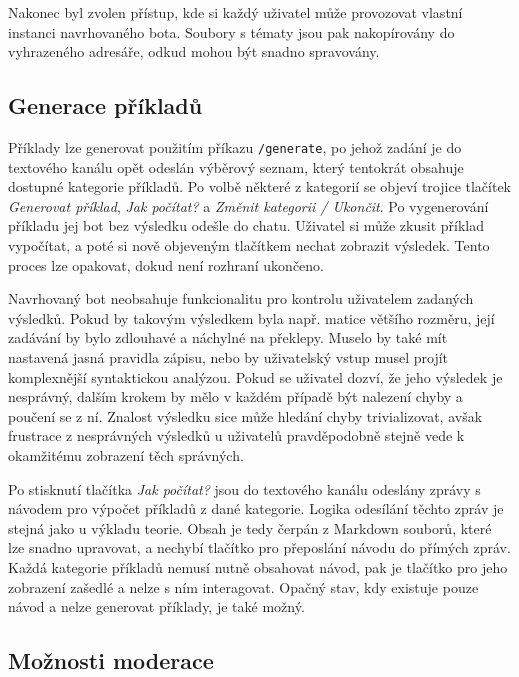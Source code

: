 \documentclass[FM]{tulthesis}
\begin{document}
	Nakonec byl zvolen přístup, kde si každý uživatel může provozovat vlastní instanci navrhovaného bota. Soubory s tématy jsou pak nakopírovány do vyhrazeného adresáře, odkud mohou být snadno spravovány. %
	
	\subsection{Generace příkladů} %
	
	Příklady lze generovat použitím příkazu \verb*|/generate|, po jehož zadání je do textového kanálu opět odeslán výběrový seznam, který tentokrát obsahuje dostupné kategorie příkladů. Po volbě některé z kategorií se objeví trojice tlačítek \textit{Generovat příklad}, \textit{Jak počítat?} a \textit{Změnit kategorii / Ukončit}. Po vygenerování příkladu jej bot bez výsledku odešle do chatu. Uživatel si může zkusit příklad vypočítat, a poté si nově objeveným tlačítkem nechat zobrazit výsledek. Tento proces lze opakovat, dokud není rozhraní ukončeno.
	
	Navrhovaný bot neobsahuje funkcionalitu pro kontrolu uživatelem zadaných výsledků. Pokud by takovým výsledkem byla např. matice většího rozměru, její zadávání by bylo zdlouhavé a náchylné na překlepy. Muselo by také mít nastavená jasná pravidla zápisu, nebo by uživatelský vstup musel projít komplexnější syntaktickou analýzou. Pokud se uživatel dozví, že jeho výsledek je nesprávný, dalším krokem by mělo v každém případě být nalezení chyby a poučení se z ní. Znalost výsledku sice může hledání chyby trivializovat, avšak frustrace z nesprávných výsledků u uživatelů pravděpodobně stejně vede k okamžitému zobrazení těch správných.
	
	Po stisknutí tlačítka \textit{Jak počítat?} jsou do textového kanálu odeslány zprávy s návodem pro výpočet příkladů z dané kategorie. Logika odesílání těchto zpráv je stejná jako u výkladu teorie. Obsah je tedy čerpán z Markdown souborů, které lze snadno upravovat, a nechybí tlačítko pro přeposlání návodu do přímých zpráv. Každá kategorie příkladů nemusí nutně obsahovat návod, pak je tlačítko pro jeho zobrazení zašedlé a nelze s ním interagovat. Opačný stav, kdy existuje pouze návod a nelze generovat příklady, je také možný. %
		
	\subsection{Možnosti moderace}
	
\end{document}
